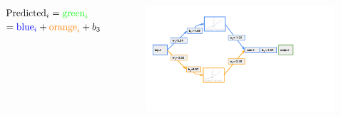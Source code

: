 \documentclass[aspectratio=169]{beamer}
\begin{document}
\begin{frame}[fragile]
\begin{columns}
            $\mathrm{Predicted}_i = \textcolor{green}{\mathrm{green}_i}$ \pause $   = \textcolor{blue}{\mathrm{blue}_i} + \textcolor{orange}{\mathrm{orange}_i} + b_3$
            
    \begin{figure}
        \centering
        \includegraphics[trim={1cm 3cm 5cm 0.35cm },clip,width=\linewidth]{BP_5}
        \end{figure}
\end{columns}
\end{frame}
\end{document}
